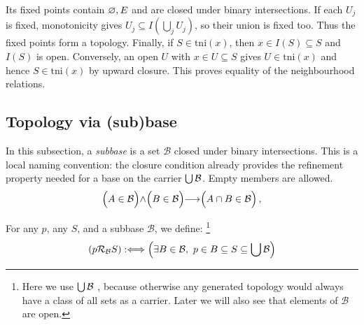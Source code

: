 Its fixed points contain $\varnothing,E$ and are closed under binary
intersections. If each $U_j$ is fixed, monotonicity gives
$U_j\subseteq I(\bigcup_j U_j)$, so their union is fixed too.
Thus the fixed points form a topology. Finally, if
$S\in\mathrm{tni}(x)$, then $x\in I(S)\subseteq S$ and $I(S)$ is
open. Conversely, an open $U$ with $x\in U\subseteq S$ gives
$U\in\mathrm{tni}(x)$ and hence $S\in\mathrm{tni}(x)$ by upward
closure. This proves equality of the neighbourhood relations.
\Done

\subsection{Topology via (sub)base}
\begin{definition}[subbase]
In this subsection, a \textit{subbase} is a set $\mathcal{B}$ closed
under binary intersections. This is a local naming convention: the
closure condition already provides the refinement property needed for
a base on the carrier $\bigcup\mathcal{B}$. Empty members are allowed.
\begin{align*}
\left(A\in \mathcal{B}\middle)\land \middle(B\in \mathcal{B}\middle)
\implies
\middle(A\cap B\in \mathcal{B} \vphantom\union \right),
\end{align*}
\end{definition}
\begin{definition}[topology via subbase]
For any $p$, any $S$, and a subbase $\mathcal{B}$, we define:
\footnote{
Here we use $\bigcup\mathcal{B}$
, because otherwise
any generated topology would always have a class of all sets as a carrier.
Later we will also see that elements of $\mathcal{B}$ are open.
}
\[
\left(p \mathcal{R}_\mathcal{B} S \right) :\Longleftrightarrow
\left(\exists B\in\mathcal{B},\  p\in B \subseteq S \subseteq \bigcup\mathcal{B}  \right)
\]
\end{definition}

